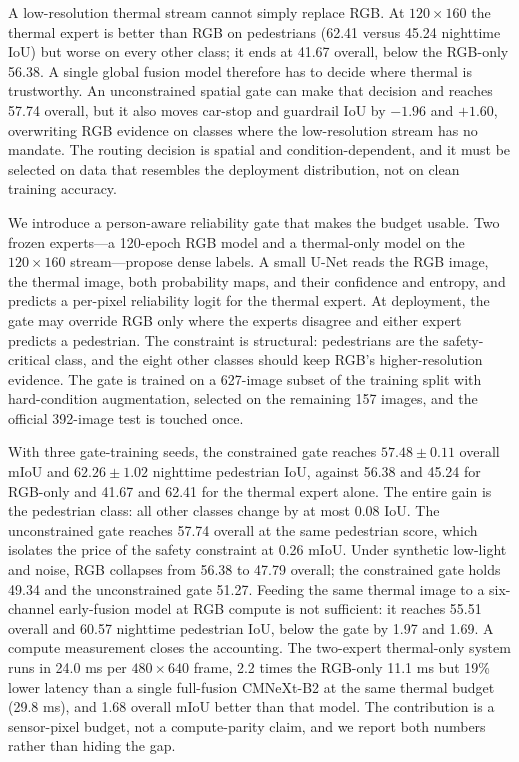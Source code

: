 A low-resolution thermal stream cannot simply replace RGB. At $120\times160$ the
thermal expert is better than RGB on pedestrians (62.41 versus 45.24 nighttime IoU)
but worse on every other class; it ends at 41.67 overall, below the RGB-only 56.38. A
single global fusion model therefore has to decide where thermal is trustworthy. An
unconstrained spatial gate can make that decision and reaches 57.74 overall, but it
also moves car-stop and guardrail IoU by $-1.96$ and $+1.60$, overwriting RGB evidence
on classes where the low-resolution stream has no mandate. The routing decision is
spatial and condition-dependent, and it must be selected on data that resembles the
deployment distribution, not on clean training accuracy.

We introduce a person-aware reliability gate that makes the budget usable. Two frozen
experts---a 120-epoch RGB model and a thermal-only model on the $120\times160$
stream---propose dense labels. A small U-Net reads the RGB image, the thermal image,
both probability maps, and their confidence and entropy, and predicts a per-pixel
reliability logit for the thermal expert. At deployment, the gate may override RGB only
where the experts disagree and either expert predicts a pedestrian. The constraint is
structural: pedestrians are the safety-critical class, and the eight other classes
should keep RGB's higher-resolution evidence. The gate is trained on a 627-image
subset of the training split with hard-condition augmentation, selected on the
remaining 157 images, and the official 392-image test is touched once.

With three gate-training seeds, the constrained gate reaches $57.48\pm0.11$ overall
mIoU and $62.26\pm1.02$ nighttime pedestrian IoU, against 56.38 and 45.24 for RGB-only
and 41.67 and 62.41 for the thermal expert alone. The entire gain is the pedestrian
class: all other classes change by at most 0.08 IoU. The unconstrained gate reaches
57.74 overall at the same pedestrian score, which isolates the price of the safety
constraint at 0.26 mIoU. Under synthetic low-light and noise, RGB collapses from 56.38
to 47.79 overall; the constrained gate holds 49.34 and the unconstrained gate 51.27.
Feeding the same thermal image to a six-channel early-fusion model at RGB compute is not
sufficient: it reaches 55.51 overall and 60.57 nighttime pedestrian IoU, below the gate
by 1.97 and 1.69. A compute measurement closes the accounting. The two-expert thermal-only system runs in
24.0 ms per $480\times640$ frame, 2.2 times the RGB-only 11.1 ms but 19\% lower latency than a
single full-fusion CMNeXt-B2 at the same thermal budget (29.8 ms), and 1.68 overall
mIoU better than that model. The
contribution is a sensor-pixel budget, not a compute-parity claim, and we report both
numbers rather than hiding the gap.

